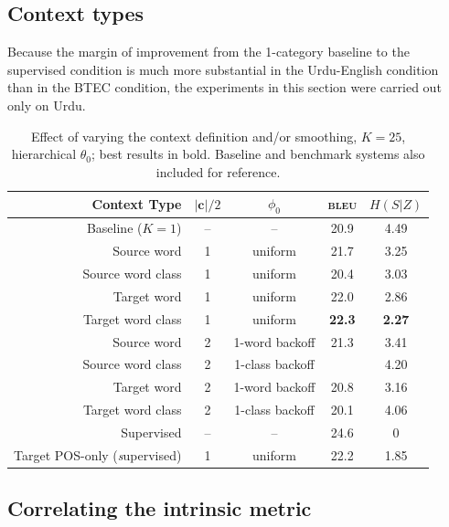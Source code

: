 \subsection{Context types}

Because the margin of improvement from the 1-category baseline to the supervised condition is much more substantial in the Urdu-English condition than in the BTEC condition, the experiments in this section were carried out only on Urdu.


\begin{table}[h]
\caption{Effect of varying the context definition and/or smoothing, $K=25$, hierarchical $\theta_0$; best results in bold. Baseline and benchmark systems also included for reference.}
\begin{center}
\begin{tabular}{r|c|c|c|c}
Context Type & $|\textbf{c}|/2$ & $\phi_0$ & \textsc{bleu} & $H(S|Z)$ \\
\hline
Baseline ($K=1$) & -- & -- & 20.9 &  4.49 \\
\hline
Source word & 1 & uniform & 21.7 & 3.25 \\
Source word class & 1 & uniform & 20.4 & 3.03 \\
Target word & 1 & uniform & 22.0 & 2.86 \\
Target word class & 1 & uniform & \textbf{22.3} & \textbf{2.27} \\
Source word & 2 & 1-word backoff & 21.3 & 3.41 \\
Source word class & 2 & 1-class backoff & & 4.20 \\
Target word & 2 & 1-word backoff & 20.8 & 3.16 \\
Target word class & 2 & 1-class backoff & 20.1 & 4.06 \\
\hline
Supervised \citep{samt} & -- & -- & 24.6 & 0 \\
Target POS-only ({\emph supervised}) & 1 & uniform & 22.2 & 1.85 \\
\end{tabular}
\end{center}
\label{tab:npbaselines}
\end{table}%

\subsection{Correlating the intrinsic metric}

